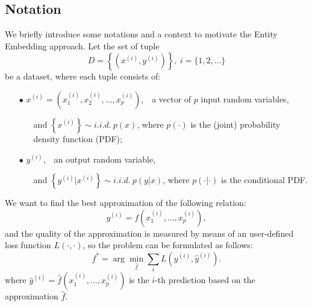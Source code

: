 \documentclass{article}
\begin{document}
\subsection{Notation}
We briefly introduce some notations and a context to motivate the Entity Embedding approach.
Let the set of tuple
\begin{equation}
    D = \left\{(x^{(i)}, y^{(i)})\right\},\ i = \{1, 2,\dots \}
\end{equation}
be a dataset, where each tuple consists of:
\begin{itemize}[nosep]
    \item[$\bullet$] $x^{(i)} = (x^{(i)}_1, x^{(i)}_2, \dots, x^{(i)}_p)$,\ \ a vector of $p$ input random variables,
        \begin{itemize}
            \item[] and $\left\{x^{(i)}\right\} \sim i.i.d.\ p(x)$, where $p(\cdot)$ is the (joint) probability density function (PDF);
        \end{itemize}
    \item[$\bullet$] $y^{(i)}$,\ \ an output random variable,
        \begin{itemize}
            \item[] and $\left\{y^{(i)}|x^{(i)}\right\} \sim i.i.d.\ p(y|x)$, where $p(\cdot|\cdot)$ is the conditional PDF.
        \end{itemize}
\end{itemize}
We want to find the best approximation of the following relation:
\begin{equation}
    y^{(i)} = f\left(x^{(i)}_1, \dots, x^{(i)}_p\right),
\end{equation}
and the quality of the approximation is measured by means of an user-defined loss function $L(\cdot, \cdot)$, so the problem can be formulated as follows:
\begin{equation}
    f^* = \arg \min_{\hat{f}} \sum_{i}L(y^{(i)}, \hat{y}^{(i)}).
\end{equation}
where $\hat{y}^{(i)} = \hat{f}\left(x^{(i)}_1, \dots, x^{(i)}_p\right)$ is the $i$-th prediction based on the approximation $\hat{f}$.
\end{document}
